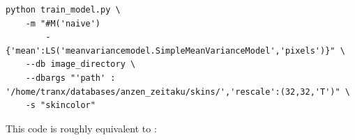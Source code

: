 \documentclass{report}
\begin{document}
\begin{lstlisting}
python train_model.py \
    -m "#M('naive')
        -{'mean':LS('meanvariancemodel.SimpleMeanVarianceModel','pixels')}" \
    --db image_directory \
    --dbargs "'path' : '/home/tranx/databases/anzen_zeitaku/skins/','rescale':(32,32,'T')" \
    -s "skincolor" 

\end{lstlisting}






This code is roughly equivalent to :
\end{document}
